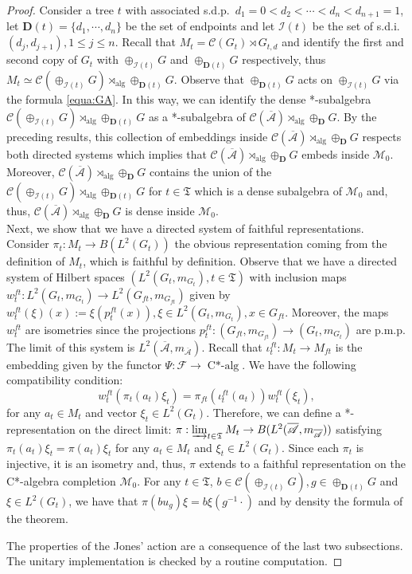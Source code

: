 \documentclass[a4paper,12pt]{amsart}
\numberwithin{equation}{section}
\theoremstyle{definition}
\newcommand{\oscrA}{{\overline{\mathscr{A}}}}
\DeclareMathOperator{\alg}{alg}
\DeclareMathOperator{\Calg}{C*-alg}
\newcommand{\scrC}{\mathscr C}
\newcommand{\D}{\mathbf D}
\newcommand{\dn}{d_1=0<d_2<\cdots<d_n<d_{n+1}=1}
\newcommand{\cF}{\mathcal F}
\newcommand{\Gd}{\oplus_\D G}
\newcommand{\cI}{\mathcal I}
\newcommand{\scrM}{\mathscr M}
\newcommand{\fT}{\mathfrak T}
\begin{document}
\begin{proof}
Consider a tree $t$ with associated s.d.p.~$\dn$, let $\D(t)=\{d_1,\cdots,d_n\}$ be the set of endpoints and let $\cI(t)$ be the set of s.d.i.~$(d_j,d_{j+1}), 1\leq j\leq n$.
Recall that $M_t=\scrC(G_t)\rtimes G_{t,d}$ and identify the first and second copy of $G_t$ with $\oplus_{\cI(t)} G$ and $\oplus_{\D(t)}G$ respectively, thus $M_t\simeq \scrC(\oplus_{\cI(t)} G)\rtimes_{\alg} \oplus_{\D(t)}G.$
Observe that $\oplus_{\D(t)}G$ acts on $\oplus_{\cI(t)} G$ via the formula \eqref{equa:GA}.
In this way, we can identify the dense *-subalgebra $\scrC(\oplus_{\cI(t)} G)\rtimes_{\alg} \oplus_{\D(t)}G$ as a *-subalgebra of $\scrC(\oscrA)\rtimes_{\alg} \Gd$.
By the preceding results, this collection of embeddings inside $\scrC(\oscrA)\rtimes_{\alg} \Gd$ respects both directed systems which implies that $\scrC(\oscrA)\rtimes_{\alg} \Gd$ embeds inside $\scrM_0$.
Moreover, $\scrC(\oscrA)\rtimes_{\alg} \Gd$ contains the union of the $\scrC(\oplus_{\cI(t)} G)\rtimes_{\alg} \oplus_{\D(t)}G$ for $t\in\fT$ which is a dense subalgebra of $\scrM_0$ and, thus, $\scrC(\oscrA)\rtimes_{\alg} \Gd$ is dense inside $\scrM_0$.\\[0.1cm]
Next, we show that we have a directed system of faithful representations.
Consider $\pi_t:M_t\to B(L^2(G_t))$ the obvious representation coming from the definition of $M_t$, which is faithful by definition.
Observe that we have a directed system of Hilbert spaces $(L^2(G_t,m_{G_t}), t\in\fT)$ with inclusion maps $w_t^{ft}:L^2(G_t,m_{G_t})\to L^2(G_{ft},m_{G_{ft}})$ given by $w_t^{ft}(\xi)(x):= \xi(p_t^{ft}(x)), \xi \in L^2(G_t,m_{G_t}), x\in G_{ft}$.
Moreover, the maps $w_t^{ft}$ are isometries since the projections $p_t^{ft}:(G_{ft},m_{G_{ft}})\to (G_t, m_{G_t})$ are p.m.p.
The limit of this system is $L^2(\oscrA,m_\oscrA)$.
Recall that $\iota_t^{ft}:M_t\to M_{ft}$ is the embedding given by the functor $\Psi:\cF\to \Calg.$
We have the following compatibility condition:
$$w_{t}^{ft} ( \pi_t (a_t) \xi_t ) = \pi_{ft} ( \iota_t^{ft} (a_t) ) w_t^{ft}(\xi_t),$$
for any $a_t\in M_t$ and vector $\xi_t\in L^2(G_t)$.
Therefore, we can define a *-representation on the direct limit:
$\pi:\varinjlim_{t\in\fT} M_t\to B(L^2(\oscrA,m_\oscrA))$ satisfying $\pi_t(a_t)\xi_t = \pi(a_t)\xi_t$ for any $a_t\in M_t$ and $\xi_t\in L^2(G_t).$
Since each $\pi_t$ is injective, it is an isometry and, thus, $\pi$ extends to a faithful representation on the C*-algebra completion $\scrM_0.$
For any $t\in\fT$, $b\in\scrC(\oplus_{\cI(t)} G), g\in \oplus_{\D(t)} G$ and $\xi \in L^2(G_t)$, we have that $\pi(bu_g)\xi = b \xi(g^{-1} \cdot)$ and by density the formula of the theorem.

The properties of the Jones' action are a consequence of the last two subsections. The unitary implementation is checked by a routine computation.
\end{proof}
\end{document}
